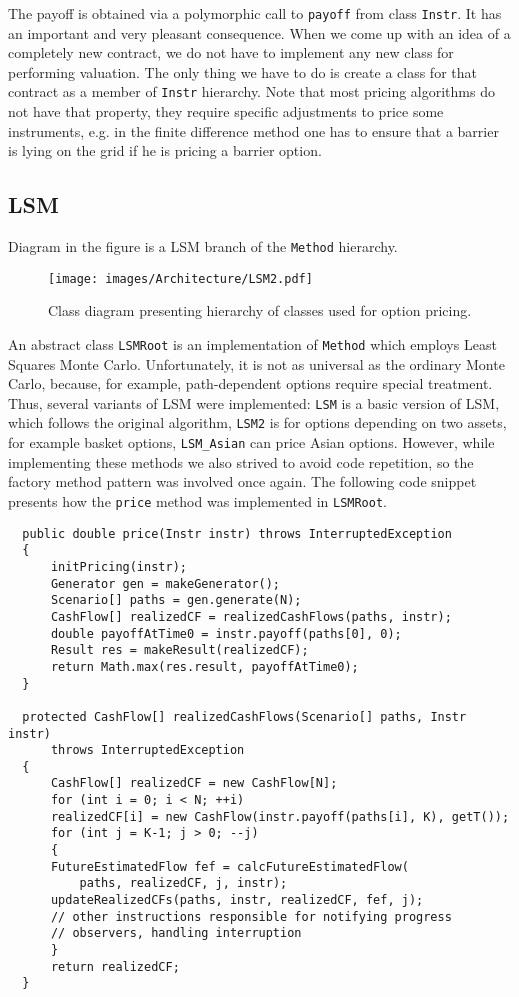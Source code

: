 \documentclass[a4paper,11pt, twoside]{book}
\theoremstyle{definition}
\theoremstyle{remark}
\begin{document}
The payoff is obtained via a polymorphic call to \texttt{payoff} from class \texttt{Instr}. It has an important and very pleasant consequence. When we come up with an idea of a completely new contract, we do not have to implement any new class for performing valuation. The only thing we have to do is create a class for that contract as a member of \texttt{Instr} hierarchy. Note that most pricing algorithms do not have that property, they require specific adjustments to price some instruments, e.g. in the finite difference method one has to ensure that a barrier is lying on the grid if he is pricing a barrier option.
   

\subsection{LSM}
Diagram in the figure is a LSM branch of the \texttt{Method} hierarchy.
\begin{figure}
\centering
 \texttt{[image: images/Architecture/LSM2.pdf]}
\caption{Class diagram presenting hierarchy of classes used for option pricing.}
\label{fig:arch:LSM}
\end{figure}

An abstract class \texttt{LSMRoot} is an implementation of \texttt{Method} which employs Least Squares Monte Carlo. Unfortunately,  it is not as universal as the ordinary Monte Carlo, because, for example, path-dependent options require  special treatment. Thus, several variants of LSM were implemented: \texttt{LSM} is a basic version of LSM, which follows the original algorithm, \texttt{LSM2} is for options depending on two assets, for example basket options, \texttt{LSM\_Asian} can price Asian options.
However, while implementing these methods we also strived to avoid code repetition, so the factory method pattern was involved once again. The following code snippet presents how the \texttt{price} method was implemented in \texttt{LSMRoot}.
\begin{lstlisting}
  public double price(Instr instr) throws InterruptedException
  {       
      initPricing(instr);
      Generator gen = makeGenerator();
      Scenario[] paths = gen.generate(N);
      CashFlow[] realizedCF = realizedCashFlows(paths, instr);
      double payoffAtTime0 = instr.payoff(paths[0], 0);
      Result res = makeResult(realizedCF);
      return Math.max(res.result, payoffAtTime0);
  }
  
  protected CashFlow[] realizedCashFlows(Scenario[] paths, Instr instr)
	  throws InterruptedException
  {
      CashFlow[] realizedCF = new CashFlow[N];
      for (int i = 0; i < N; ++i)
	  realizedCF[i] = new CashFlow(instr.payoff(paths[i], K), getT());
      for (int j = K-1; j > 0; --j)
      {
	  FutureEstimatedFlow fef = calcFutureEstimatedFlow(
	      paths, realizedCF, j, instr);
	  updateRealizedCFs(paths, instr, realizedCF, fef, j);
	  // other instructions responsible for notifying progress
	  // observers, handling interruption
      }       
      return realizedCF;
  }
\end{lstlisting} 
\end{document}
